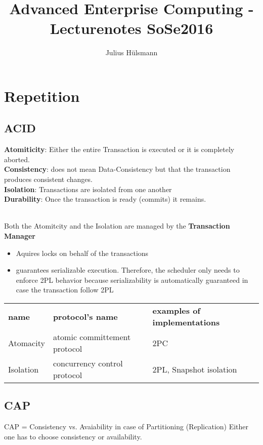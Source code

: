 \documentclass[a4paper,12pt]{article}%
\title{Advanced Enterprise Computing - Lecturenotes SoSe2016}
\author{Julius Hülsmann}
\begin{document}
  \maketitle
  \tableofcontents
  \newpage

\section{Repetition}
\subsection{ACID}

{\bf Atomiticity}: Either the entire Transaction is executed or it is completely aborted.\\
{\bf Consistency}: does not mean Data-Consistency but that the transaction produces consistent changes.\\
{\bf Isolation}: Transactions are isolated from one another\\
{\bf Durability}: Once the transaction is ready (commits) it remains.

~\\
Both the Atomitcity and the Isolation are managed by the {\bf Transaction Manager}
\begin{itemize}
 \item Aquires locks on behalf of the transactions
 \item guarantees serializable execution. Therefore, the scheduler only needs to enforce 2PL behavior because serializability is automatically guaranteed in case the transaction follow 2PL
\end{itemize}

\begin{table}[h]
 \centering
\begin{tabular}{lll}
\rowcolor[HTML]{ECF4FF} 
\textbf{name} & \textbf{protocol's name}     & \textbf{examples of implementations} \\
\rowcolor[HTML]{F7F7F7} 
Atomacity     & atomic committement protocol & 2PC                                  \\
\rowcolor[HTML]{EFEFEF} 
Isolation     & concurrency control protocol & 2PL, Snapshot isolation             
\end{tabular}
\end{table}


\subsection{CAP}
CAP = Consistency vs. Avaiability in case of Partitioning (Replication) Either one has to choose consistency or availability.
\end{document}
